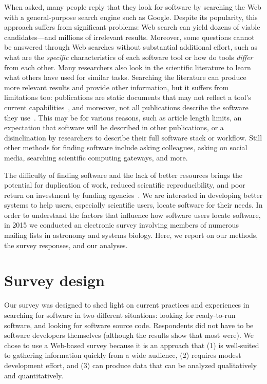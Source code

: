 \documentclass{casicswhitepaper}
\begin{document}
When asked, many people reply that they look for software by searching the Web with a general-purpose search engine such as Google.  Despite its popularity, this approach suffers from significant problems: Web search can yield dozens of viable candidates---and millions of irrelevant results.  Moreover, some questions cannot be answered through Web searches without substantial additional effort, such as what are the \emph{specific} characteristics of each software tool or how do tools \emph{differ} from each other.  Many researchers also look in the scientific literature to learn what others have used for similar tasks.  Searching the literature can produce more relevant results and provide other information, but it suffers from limitations too: publications are static documents that may not reflect a tool's current capabilities~\cite{wren_2004}, and moreover, not all publications describe the software they use~\cite{howison2015software}.  This may be for various reasons, such as article length limits, an expectation that software will be described in other publications, or a disinclination by researchers to describe their full software stack or workflow.  Still other methods for finding software include asking colleagues, asking on social media, searching scientific computing gateways, and more.

The difficulty of finding software and the lack of better resources brings the potential for duplication of work, reduced scientific reproducibility, and poor return on investment by funding agencies~\citep{cannata_2005, national2003sharing, crook2013learning, poisot2015best, white2014nih, niemeyer2016challenge}.  We are interested in developing better systems to help users, especially scientific users, locate software for their needs.  In order to understand the factors that influence how software users locate software, in 2015 we conducted an electronic survey involving members of numerous mailing lists in astronomy and systems biology.  Here, we report on our methods, the survey responses, and our analyses.


\section{Survey design}

Our survey was designed to shed light on current practices and experiences in searching for software in two different situations: looking for ready-to-run software, and looking for software source code.  Respondents did not have to be software developers themselves (although the results show that most were).  We chose to use a Web-based survey because it is an approach that (1) is well-suited to gathering information quickly from a wide audience, (2) requires modest development effort, and (3) can produce data that can be analyzed qualitatively and quantitatively.
\end{document}
